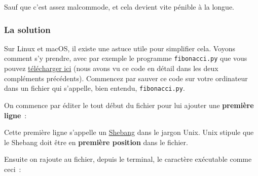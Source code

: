     Sauf que c'est assez malcommode, et cela devient vite pénible à la
longue.

    \hypertarget{la-solution}{%
\subsubsection{La solution}\label{la-solution}}

    Sur Linux et macOS, il existe une astuce utile pour simplifier cela.
Voyons comment s'y prendre, avec par exemple le programme
\texttt{fibonacci.py} que vous pouvez
\href{data/fibonacci.py}{télécharger ici} (nous avons vu ce code en
détail dans les deux compléments précédents). Commencez par sauver ce
code sur votre ordinateur dans un fichier qui s'appelle, bien entendu,
\texttt{fibonacci.py}.

    On commence par éditer le tout début du fichier pour lui ajouter une
\textbf{première ligne}~:

    \begin{Shaded}
\begin{Highlighting}[frame=lines,framerule=0.6mm,rulecolor=\color{asisframecolor}]

\end{Highlighting}
\end{Shaded}

    Cette première ligne s'appelle un
\href{http://en.wikipedia.org/wiki/Shebang_\%28Unix\%29}{Shebang} dans
le jargon Unix. Unix stipule que le Shebang doit être en
\textbf{première position} dans le fichier.

    Ensuite on rajoute au fichier, depuis le terminal, le caractère
exécutable comme ceci~:

    \begin{Shaded}
\begin{Highlighting}[frame=lines,framerule=0.6mm,rulecolor=\color{asisframecolor}]
\NormalTok{$ }
\end{Highlighting}
\end{Shaded}

    \begin{Shaded}
\begin{Highlighting}[frame=lines,framerule=0.6mm,rulecolor=\color{asisframecolor}]
\NormalTok{$ }
\end{Highlighting}
\end{Shaded}

